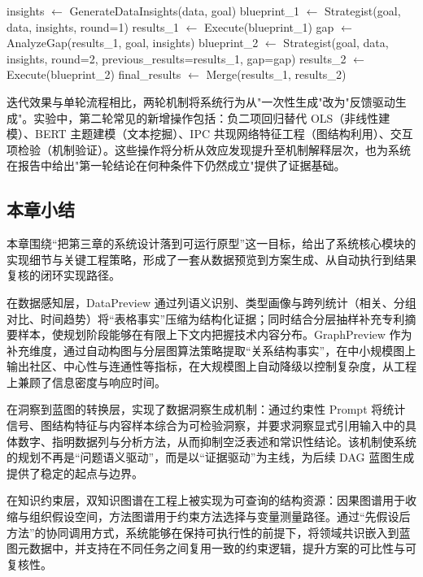 \begin{algorithm}[H]
\caption{两轮规划流程}

insights $\leftarrow$ GenerateDataInsights(data, goal)\;
blueprint\_1 $\leftarrow$ Strategist(goal, data, insights, round=1)\;
results\_1 $\leftarrow$ Execute(blueprint\_1) 
gap $\leftarrow$ AnalyzeGap(results\_1, goal, insights)\;
blueprint\_2 $\leftarrow$ Strategist(goal, data, insights, round=2, previous\_results=results\_1, gap=gap)\;
results\_2 $\leftarrow$ Execute(blueprint\_2)\;
final\_results $\leftarrow$ Merge(results\_1, results\_2)\;
\;
\end{algorithm}

迭代效果与单轮流程相比，两轮机制将系统行为从"一次性生成"改为"反馈驱动生成"。实验中，第二轮常见的新增操作包括：负二项回归替代 OLS（非线性建模）、BERT 主题建模（文本挖掘）、IPC 共现网络特征工程（图结构利用）、交互项检验（机制验证）。这些操作将分析从效应发现提升至机制解释层次，也为系统在报告中给出"第一轮结论在何种条件下仍然成立"提供了证据基础。

\subsection{本章小结}

本章围绕“把第三章的系统设计落到可运行原型”这一目标，给出了系统核心模块的实现细节与关键工程策略，形成了一套从数据预览到方案生成、从自动执行到结果复核的闭环实现路径。

在数据感知层，DataPreview 通过列语义识别、类型画像与跨列统计（相关、分组对比、时间趋势）将“表格事实”压缩为结构化证据；同时结合分层抽样补充专利摘要样本，使规划阶段能够在有限上下文内把握技术内容分布。GraphPreview 作为补充维度，通过自动构图与分层图算法策略提取“关系结构事实”，在中小规模图上输出社区、中心性与连通性等指标，在大规模图上自动降级以控制复杂度，从工程上兼顾了信息密度与响应时间。

在洞察到蓝图的转换层，实现了数据洞察生成机制：通过约束性 Prompt 将统计信号、图结构特征与内容样本综合为可检验洞察，并要求洞察显式引用输入中的具体数字、指明数据列与分析方法，从而抑制空泛表述和常识性结论。该机制使系统的规划不再是“问题语义驱动”，而是以“证据驱动”为主线，为后续 DAG 蓝图生成提供了稳定的起点与边界。

在知识约束层，双知识图谱在工程上被实现为可查询的结构资源：因果图谱用于收缩与组织假设空间，方法图谱用于约束方法选择与变量测量路径。通过“先假设后方法”的协同调用方式，系统能够在保持可执行性的前提下，将领域共识嵌入到蓝图元数据中，并支持在不同任务之间复用一致的约束逻辑，提升方案的可比性与可复核性。

